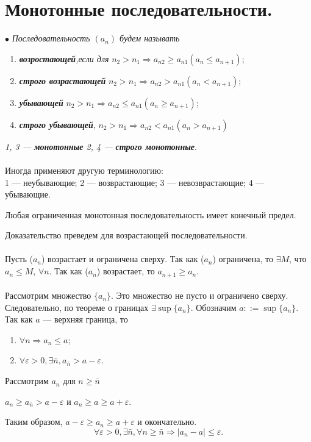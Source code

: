 \section{Монотонные последовательности.}
$\bullet$ \textit{Последовательность $(a_n)$ будем называть}
\begin{enumerate}
	\item \textit{\textbf{возростающей},если для} $n_2>n_1\Rightarrow a_{n2}\geqslant a_{n1}(a_n\leqslant a_{n+1})$;
	\item \textit{\textbf{строго возрастающей}} $n_2>n_1\Rightarrow a_{n2} > a_{n1}(a_n < a_{n+1})$;
	\item \textit{\textbf{убывающей}} $n_2>n_1\Rightarrow a_{n2} \leqslant a_{n1}(a_n\geqslant a_{n+1})$;
	\item \textit{\textbf{строго убывающей}}, $n_2>n_1\Rightarrow  a_{n2} < a_{n1}(a_n > a_{n+1})$
\end{enumerate}
\textit{1, 3 --- \textbf{монотонные} 2, 4 --- \textbf{строго монотонные}}.\\\\
Иногда применяют другую терминологию:\\
1 --- неубывающие; 2 --- возврастающие; 3 --- невозврастающие; 4 --- убывающие.
\begin{theorem} 
	Любая ограниченная монотонная последовательность имеет конечный предел.
\end{theorem}
\begin{Proof}
	Доказательство преведем для возрастающей последовательности.\\\\
	Пусть ($a_n$) возрастает и ограничена сверху. Так как ($a_n$) ограничена, то $\exists M$, что $a_n\leqslant M$, $\forall n$. Так как ($a_n$) возрастает, то $a_{n+1}\geqslant a_n$.\\\\
	Рассмотрим множество $\{a_n\}$. Это множество не пусто и ограничено сверху. Следовательно, по теореме о границах $\exists \sup \{a_n\}$.
	Обозначим $a::=\sup\{a_n\}$. Так как $a$ --- верхняя граница, то \begin{enumerate}
		\item $\forall n \Rightarrow a_n \leqslant a$;
		\item $\forall\varepsilon > 0,\exists \bar n, a_{ \bar n}> a - \varepsilon$.
	\end{enumerate}
	Рассмотрим $a_n$ для $n\geqslant \bar n$\begin{center}
		$a_n\geqslant a_{ \bar n}>a-\varepsilon$ и $a_n\geqslant a\geqslant a+\varepsilon$.
	\end{center}
	Таким образом, $a-\varepsilon\geqslant a_n\geqslant a+\varepsilon$ и окончательно.
	$$\forall\varepsilon >0,\exists\bar n ,\forall n \geqslant \bar n \Rightarrow |a_n - a|\leqslant\varepsilon.$$
\end{Proof}\\
